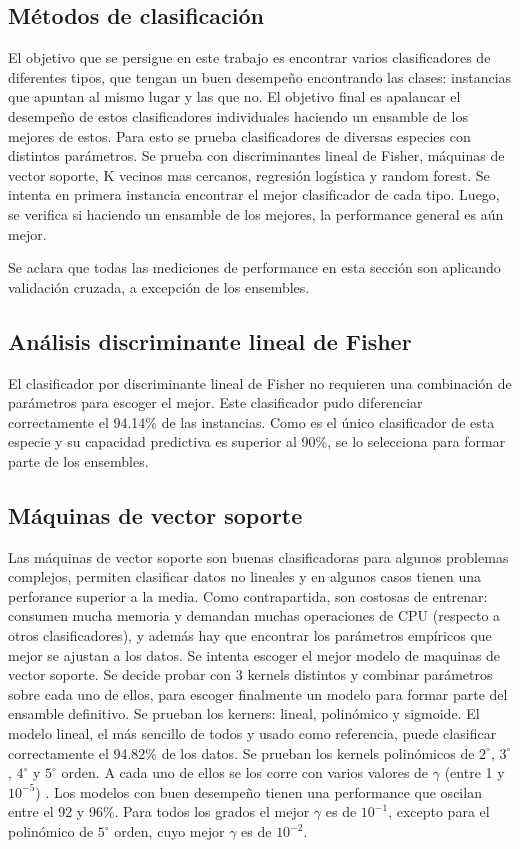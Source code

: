 \documentclass[journal]{IEEEtran}
\begin{document}
\subsection{Métodos de clasificación}
El objetivo que se persigue en este trabajo es encontrar varios clasificadores
de diferentes tipos, que tengan un buen desempeño encontrando las clases:
instancias que apuntan al mismo lugar y las que no. El objetivo final es apalancar
el desempeño de estos clasificadores individuales haciendo un ensamble
de los mejores de estos. 
Para esto se prueba clasificadores de diversas especies con distintos parámetros.
Se prueba con discriminantes lineal de Fisher, 
máquinas de vector soporte, K vecinos mas cercanos, regresión logística
y random forest. Se intenta en primera 
instancia encontrar el mejor clasificador de cada tipo. Luego, se verifica si
haciendo un ensamble de los mejores, la performance general es aún mejor.

Se aclara que todas las mediciones de performance en esta
sección son aplicando validación cruzada, a excepción de los ensembles.

\subsection{Análisis discriminante lineal de Fisher}
El clasificador por discriminante lineal de Fisher no requieren una combinación 
de parámetros para escoger el mejor. Este clasificador pudo diferenciar correctamente
el 94.14\% de las instancias. Como es el único clasificador de esta especie
y su capacidad predictiva es superior al 90\%, se lo selecciona para
formar parte de los ensembles.

\subsection{Máquinas de vector soporte}
Las máquinas de vector soporte son buenas clasificadoras para algunos problemas complejos, permiten
clasificar datos no lineales y en algunos casos tienen una perforance superior a la media.
Como contrapartida, son costosas de entrenar: consumen mucha  memoria y
demandan muchas operaciones de CPU (respecto a otros clasificadores), y además hay que encontrar
los parámetros empíricos que mejor se ajustan a los datos.  
Se intenta escoger el mejor modelo de maquinas de vector soporte. Se
decide probar con 3 kernels distintos y combinar parámetros sobre
cada uno de ellos, para escoger finalmente un modelo para formar parte
del ensamble definitivo. Se prueban los kerners: lineal, polinómico y
sigmoide. El modelo lineal, el más sencillo de todos y usado como referencia,
puede clasificar correctamente el 94.82\% de los datos. 
Se prueban los kernels polinómicos de $2^{\circ}$, $3^{\circ}$, $4^{\circ}$ y $5^{\circ}$ orden. A cada
uno de ellos se los corre con varios valores de $\gamma$ (entre 1 y $10^{-5}$) . Los modelos
con buen desempeño tienen una performance que oscilan entre el 92 y
96\%. Para todos los grados el mejor $\gamma$ es de $10^{-1}$, excepto para el polinómico
de $5^{\circ}$ orden, cuyo mejor $\gamma$ es de $10^{-2}$. 
\end{document}
